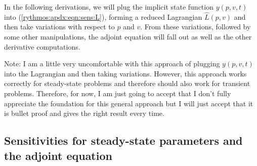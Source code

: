 In the following derivations, we will plug the implicit state function
$y(p,v,t)$ into (\ref{rythmos:apdx:eqn:sens:L}), forming a reduced
Lagrangian $\hat{L}(p,v)$ and then take variations with
respect to $p$ and $v$.  From these variations, followed by
some other manipulations, the adjoint equation will fall out as well
as the other derivative computations.

Note: I am a little very uncomfortable with this approach of plugging
$y(p,v,t)$ into the Lagrangian and then taking variations.  However,
this approach works correctly for steady-state problems and therefore should
also work for transient problems.  Therefore, for now, I am just going to
accept that I don't fully appreciate the foundation for this general approach
but I will just accept that it is bullet proof and gives the right result
every time.

\subsection{Sensitivities for steady-state parameters and the adjoint equation}

